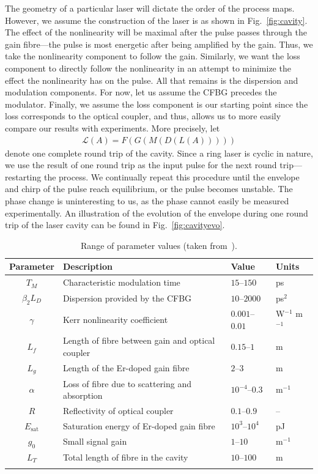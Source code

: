 \documentclass[9pt,twocolumn,twoside]{osajnl}
\newcommand{\Es}{E_{\textrm{sat}}} %
\begin{document}
The geometry of a particular laser will dictate the order of the process maps. However, we assume the construction of the laser is as shown in Fig.~\ref{fig:cavity}. The effect of the nonlinearity will be maximal after the pulse passes through the gain fibre---the pulse is most energetic after being amplified by the gain. Thus, we take the nonlinearity component to follow the gain. Similarly, we want the loss component to directly follow the nonlinearity in an attempt to minimize the effect the nonlinearity has on the pulse. All that remains is the dispersion and modulation components. For now, let us assume the CFBG precedes the modulator. Finally, we assume the loss component is our starting point since the loss corresponds to the optical coupler, and thus, allows us to more easily compare our results with experiments. More precisely, let
\begin{align}
	\mathcal{L}(A) = F(G(M(D(L(A)))))
	\label{eq:order}
\end{align}
denote one complete round trip of the cavity. Since a ring laser is cyclic in nature, we use the result of one round trip as the input pulse for the next round trip---restarting the process. We continually repeat this procedure until the envelope and chirp of the pulse reach equilibrium, or the pulse becomes unstable. The phase change is uninteresting to us, as the phase cannot easily be measured experimentally. An illustration of the evolution of the envelope during one round trip of the laser cavity can be found in Fig.~\ref{fig:cavityevo}.

\begin{table}[!b]
	\centering
	\caption{Range of parameter values (taken from~\cite{agrawal2013, burgoyne2014, burgoyneemail, tamura1996, usechak2005}).}
 	\label{tab:values}
 	\begin{tabular}{clll}
		\hline
		Parameter & Description & Value & Units \\
		\hline\noalign{\smallskip}
		$T_M$ & Characteristic modulation time & $15$--$150$ & ps \\
		$\beta_2 L_D$ & Dispersion provided by the CFBG & $10$--$2000$ & ps$^2$ \\
		$\gamma$ & Kerr nonlinearity coefficient & $0.001$--$0.01$ & W$^{-1}$ m$^{-1}$ \\
		$L_f$ & Length of fibre between gain and optical coupler & $0.15$--$1$ & m \\
		$L_g$ & Length of the Er-doped gain fibre & $2$--$3$ & m \\
		$\alpha$ & Loss of fibre due to scattering and absorption & $10^{-4}$--$0.3$ & m$^{-1}$ \\
		$R$ & Reflectivity of optical coupler & $0.1$--$0.9$ & -- \\
		$\Es$ & Saturation energy of Er-doped gain fibre & $10^3$--$10^4$ & pJ \\
		$g_0$ & Small signal gain &  $1$--$10$ & m$^{-1}$ \\
		$L_T$ & Total length of fibre in the cavity & $10$--$100$ & m \\
		\noalign{\smallskip}\hline
	\end{tabular}
\end{table}
\end{document}
